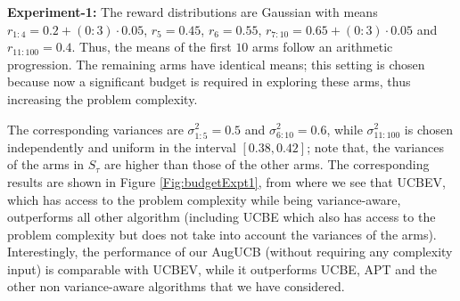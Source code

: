  
 

	
\textbf{Experiment-1:} The reward distributions are Gaussian with  means  $r_{1:4}=0.2+(0:3)\cdot0.05$, $r_{5}=0.45$, $r_{6}=0.55$, $r_{7:10}=0.65+(0:3)\cdot0.05$ and $r_{11:100}=0.4$. Thus, the means of the first $10$ arms follow an arithmetic progression. The remaining arms have identical means; this setting is chosen because now a significant budget is required in exploring these arms, thus increasing the problem complexity.

 The corresponding variances are $\sigma_{1:5}^{2}=0.5$ and $\sigma_{6:10}^{2}=0.6$, while $\sigma_{11:100}^{2}$ is chosen independently and uniform in the  interval $[0.38,0.42]$;
note that, the variances of the arms in $S_\tau$ are higher than those of the other arms.
 The corresponding  results are shown in Figure \ref{Fig:budgetExpt1},
 from where we see that UCBEV, which has access to the problem complexity while being variance-aware, outperforms all other algorithm (including UCBE which also has access to the problem complexity but does not take into account the variances of the arms).  Interestingly, the performance of our AugUCB (without requiring any complexity input) is comparable with UCBEV, while it 
 outperforms UCBE, APT and the other non variance-aware algorithms that we have considered. 	
	

